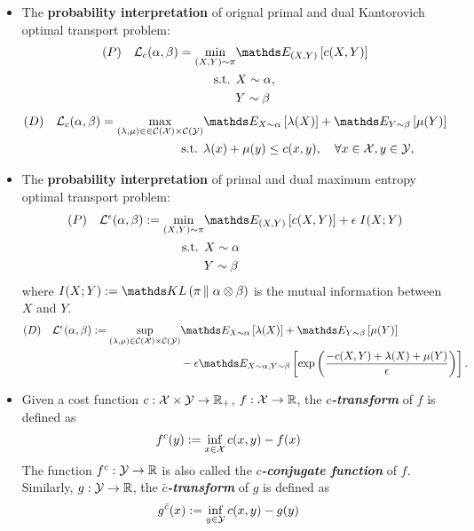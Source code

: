 \documentclass[11pt]{article}
\begin{document}
\begin{itemize}
\item The \textbf{probability interpretation} of orignal primal and dual Kantorovich optimal transport problem: 
\begin{align}
(P)\quad \cL_{c}(\alpha, \beta) = \min_{(X, Y) \sim \pi}& \E{(X,Y)}{c(X, Y)}   \label{eqn: optimal_transport_prob} \\
\text{s.t. }&  X \sim \alpha,  \nonumber \\
& Y\sim \beta  \nonumber
\end{align}
\begin{align}
(D)\quad \cL_{c}(\alpha, \beta) = \max_{(\lambda,  \mu) \in \in \cC(\cX)\times \cC(\cY)} & \E{X\sim \alpha}{\lambda(X)} + \E{Y \sim \beta}{\mu(Y)} \label{eqn: optimal_transport_dual_prob} \\
\text{s.t. }&  \lambda(x) + \mu(y) \le c(x, y),\quad \forall x\in \cX, y \in \cY, \nonumber
\end{align}

\item The \textbf{probability interpretation} of primal and dual maximum entropy optimal transport problem:
\begin{align}
(P)\quad \cL^{\epsilon}(\alpha, \beta) :=\min_{(X, Y) \sim \pi}& \E{(X,Y)}{c(X, Y)} + \epsilon\; I(X; Y) \label{eqn: optimal_transport_mutual_info} \\
\text{s.t. }& X\sim \alpha \nonumber\\
&Y \sim \beta \nonumber
\end{align} where $I(X; Y) :=  \kl{\pi}{\alpha\otimes \beta}$ is the mutual information between $X$ and $Y$.
\begin{align}
(D)\quad \cL^{\epsilon}(\alpha, \beta) := \sup_{(\lambda,\mu) \in \cC(\cX) \times \cC(\cY)} & \E{X \sim \alpha }{\lambda(X)}  + \E{Y \sim \beta}{\mu(Y)} \nonumber\\
& - \epsilon \E{X \sim \alpha, Y \sim \beta}{\exp\paren{\frac{-c(X,Y) + \lambda(X)+ \mu(Y)}{\epsilon}}}.  \label{eqn: optimal_transport_dual_entropy_prob}
\end{align}

\item Given a cost function $c: {\mathcal X} \times {\mathcal Y} \rightarrow {\mathbb R}_{+}$, $f: {\mathcal X} \rightarrow {\mathbb R}$, the \textbf{\emph{$c$-transform}} of $f$ is defined as
\begin{align}
f^{c}(y) &:= \inf_{x\in {\mathcal X}}c(x, y) - f(x)  \label{eqn: c_transform}
\end{align} The function $f^{c}: {\mathcal Y} \rightarrow {\mathbb R}$ is also called the \textbf{\emph{$c$-conjugate function}} of $f$. Similarly, $g: {\mathcal Y} \rightarrow {\mathbb R}$, the \textbf{\emph{$\bar{c}$-transform}} of $g$ is defined as
\begin{align}
g^{\bar{c}}(x) &:= \inf_{y\in {\mathcal Y}}c(x, y) - g(y)  \label{eqn: c_bar_transform}
\end{align} 


\end{itemize}
\end{document}
